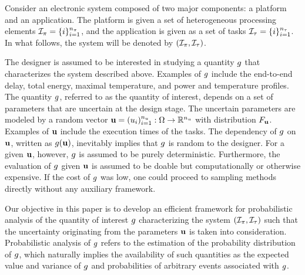 Consider an electronic system composed of two major components: a platform and
an application. The platform is given a set of heterogeneous processing elements
${\mathcal{I}_{\pi}} = \{ i \}_{i = 1}^{n_\pi}$, and the application is given as a set of tasks
${\mathcal{I}_{\tau}} = \{ i \}_{i = 1}^{n_\tau}$. In what follows, the system will be denoted by
$({\mathcal{I}_{\pi}}, {\mathcal{I}_{\tau}})$.

The designer is assumed to be interested in studying a quantity $g$ that
characterizes the system described above. Examples of $g$ include the
end-to-end delay, total energy, maximal temperature, and power and temperature
profiles. The quantity $g$, referred to as the quantity of interest, depends on
a set of parameters that are uncertain at the design stage. The uncertain
parameters are modeled by a random vector $\mathbf{u} = (u_i)_{i = 1}^{n_u}: \Omega
\to \mathbb{R}^{n_u}$ with distribution $F_{\mathbf{u}}$. Examples of $\mathbf{u}$ include
the execution times of the tasks. The dependency of $g$ on $\mathbf{u}$, written as
$g(\mathbf{u})$, inevitably implies that $g$ is random to the designer. For a given
$\mathbf{u}$, however, $g$ is assumed to be purely deterministic. Furthermore, the
evaluation of $g$ given $\mathbf{u}$ is assumed to be doable but computationally or
otherwise expensive. If the cost of $g$ was low, one could proceed to sampling
methods directly without any auxiliary framework.

Our objective in this paper is to develop an efficient framework for
probabilistic analysis of the quantity of interest $g$ characterizing the
system $({\mathcal{I}_{\pi}}, {\mathcal{I}_{\tau}})$ such that the uncertainty originating from the
parameters $\mathbf{u}$ is taken into consideration. Probabilistic analysis of $g$
refers to the estimation of the probability distribution of $g$, which
naturally implies the availability of such quantities as the expected value and
variance of $g$ and probabilities of arbitrary events associated with $g$.
